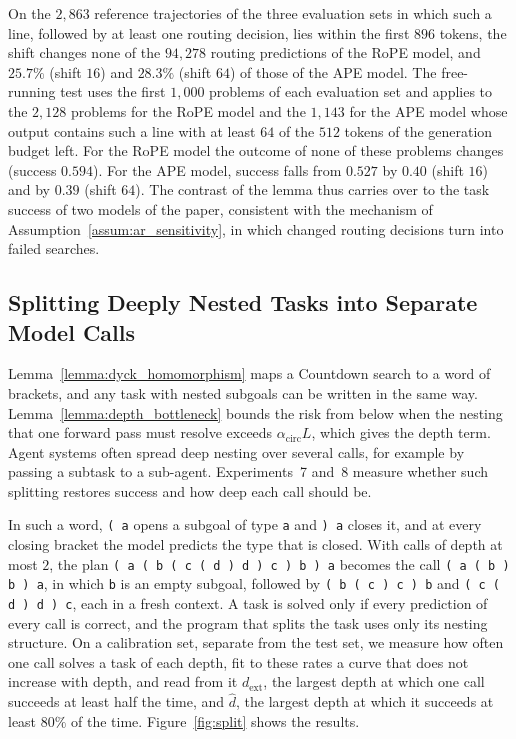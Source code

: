 On the $2{,}863$ reference trajectories of the three evaluation sets in which such a line, followed by at least one routing decision, lies within the first $896$ tokens, the shift changes none of the $94{,}278$ routing predictions of the RoPE model, and $25.7\%$ (shift $16$) and $28.3\%$ (shift $64$) of those of the APE model. The free-running test uses the first $1{,}000$ problems of each evaluation set and applies to the $2{,}128$ problems for the RoPE model and the $1{,}143$ for the APE model whose output contains such a line with at least $64$ of the $512$ tokens of the generation budget left. For the RoPE model the outcome of none of these problems changes (success $0.594$). For the APE model, success falls from $0.527$ by $0.40$ (shift $16$) and by $0.39$ (shift $64$). The contrast of the lemma thus carries over to the task success of two models of the paper, consistent with the mechanism of Assumption~\ref{assum:ar_sensitivity}, in which changed routing decisions turn into failed searches.

\subsection{Splitting Deeply Nested Tasks into Separate Model Calls}
\label{app:handoff}

Lemma~\ref{lemma:dyck_homomorphism} maps a Countdown search to a word of brackets, and any task with nested subgoals can be written in the same way. Lemma~\ref{lemma:depth_bottleneck} bounds the risk from below when the nesting that one forward pass must resolve exceeds $\alpha_{\mathrm{circ}}L$, which gives the depth term. Agent systems often spread deep nesting over several calls, for example by passing a subtask to a sub-agent. Experiments~7 and~8 measure whether such splitting restores success and how deep each call should be.

In such a word, \texttt{( a} opens a subgoal of type \texttt{a} and \texttt{) a} closes it, and at every closing bracket the model predicts the type that is closed. With calls of depth at most $2$, the plan \texttt{( a ( b ( c ( d ) d ) c ) b ) a} becomes the call \texttt{( a ( b ) b ) a}, in which \texttt{b} is an empty subgoal, followed by \texttt{( b ( c ) c ) b} and \texttt{( c ( d ) d ) c}, each in a fresh context. A task is solved only if every prediction of every call is correct, and the program that splits the task uses only its nesting structure. On a calibration set, separate from the test set, we measure how often one call solves a task of each depth, fit to these rates a curve that does not increase with depth, and read from it $d_{\mathrm{ext}}$, the largest depth at which one call succeeds at least half the time, and $\hat d$, the largest depth at which it succeeds at least $80\%$ of the time. Figure~\ref{fig:split} shows the results.

